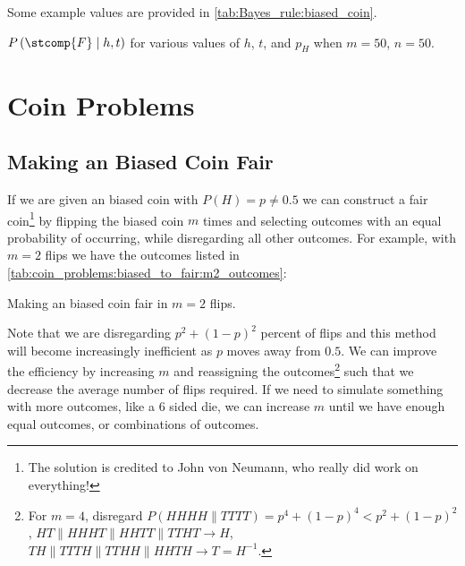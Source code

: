 Some example values are provided in \cref{tab:Bayes_rule:biased_coin}.

\begin{table}[H]
\centering
\begingroup
\renewcommand*{\arraystretch}{1}

\endgroup
\caption{
$P\left(\stcomp{F} \mid h,t\right)$ for various values of $h$, $t$, and $p_{H}$ when $m = 50$, $n = 50$.
}
\label{tab:Bayes_rule:biased_coin}
\end{table}

\section{Coin Problems}
\label{stats:coin_problems}

\subsection{Making an Biased Coin Fair}
\label{stats:coin_problems:biased_to_fair}

If we are given an biased coin with $P\left(H\right) = p \neq \num{0.5}$
we can construct a fair coin\footnote{The solution is credited to John von Neumann, who really did work on everything!} by
flipping the biased coin $m$ times and selecting outcomes with an equal probability of occurring, while disregarding all other outcomes.
For example, with $m=2$ flips we have the outcomes listed in \cref{tab:coin_problems:biased_to_fair:m2_outcomes}:

\begin{table}[H]
\centering
\begingroup
\renewcommand*{\arraystretch}{1}

\endgroup
\caption{
Making an biased coin fair in $m=2$ flips.
}
\label{tab:coin_problems:biased_to_fair:m2_outcomes}
\end{table}

Note that we are disregarding $p^{2} + \left(1-p\right)^{2}$ percent of flips
and this method will become increasingly inefficient as $p$ moves away from $\num{0.5}$.
We can improve the efficiency by increasing $m$ and reassigning the
outcomes\footnote{For $m = \num{4}$, disregard $P\left(HHHH \parallel TTTT\right) = p^{4} + \left(1-p\right)^{4} < p^{2} + \left(1-p\right)^{2}$,\newline
$HT \parallel HHHT \parallel HHTT \parallel TTHT \to H$,\newline
$TH \parallel TTTH \parallel TTHH \parallel HHTH \to T = H^{-1}$.} such that
we decrease the average number of flips required.
If we need to simulate something with more outcomes, like a 6 sided die,
we can increase $m$ until we have enough equal outcomes, or combinations of outcomes.

